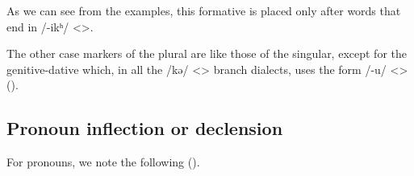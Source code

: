 As we can see from the examples, this formative is placed only after words that end in /-ikʰ/ <>.


The other case markers of the plural are like those of the singular, except for the genitive-dative which, in all the /kə/ <> branch dialects, uses the form /-u/ <> (). 


\begin{table}[H]
	\centering
	\caption{Genitive-dative of the plural in the Karin dialect}
	\label{tab:Karin:morpho:noun:plGen}
\end{table}



\begin{adjarianpage}\label{page:109}\end{adjarianpage}%

\subsection{Pronoun inflection or declension}

For pronouns, we note the following (). 


